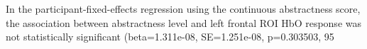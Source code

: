 In the participant-fixed-effects regression using the continuous abstractness score, the association between abstractness level and left frontal ROI HbO response was not statistically significant (beta=1.311e-08, SE=1.251e-08, p=0.303503, 95%
